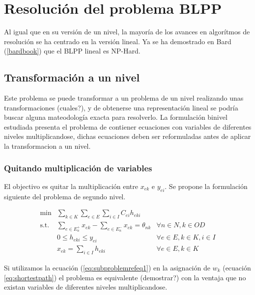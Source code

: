 \documentclass{article}
\begin{document}
  \section*{Resolución del problema BLPP}

  Al igual que en su versión de un nivel, la mayoría de los avances en algorítmos de resolución se ha centrado en la versión lineal. Ya se ha demostrado en Bard (\ref{bardbook}) que el BLPP lineal es NP-Hard.

  \subsection*{Transformación a un nivel}

  Este problema se puede transformar a un problema de un nivel realizando unas transformaciones (cuales?), y de obtenerse una representación lineal se podría buscar alguna mateodología exacta para resolverlo. La formulación binivel estudiada presenta el problema de contiener ecuaciones con variables de diferentes niveles multiplicandose, dichas ecuaciones deben ser reformuladas antes de aplicar la transformacion a un nivel.

  \subsubsection*{Quitando multiplicación de variables}

  El objectivo es quitar la multiplicación entre $x_{ek}$ e $y_{ei}$. Se propone la formulación siguiente del problema de segundo nivel.

  \begin{align}
    \text{min}  & \sum_{k \in K} \sum_{e \in E} \sum_{i \in I} C_{ei} h_{eki}         & \label{eq:subproblemrefeq1} \\
    \text{s.t.} & \sum_{e \in E_n^+} x_{ek} - \sum_{e \in E_n^-} x_{ek} = \theta_{nk} & \forall n \in N, k \in OD \\
                & 0 \leq h_{eki} \leq y_{ei}                                          & \forall e \in E, k \in K, i \in I \\
                & x_{ek} = \sum_{i \in I} h_{eki}                                     & \forall e \in E, k \in K
  \end{align}

  Si utilizamos la ecuación (\ref{eq:subproblemrefeq1}) en la asignación de $w_k$ (ecuación \ref{eq:shortestpath}) el problema es equivalente (demostrar?) con la ventaja que no existan variables de diferentes niveles multiplicandose.
\end{document}

